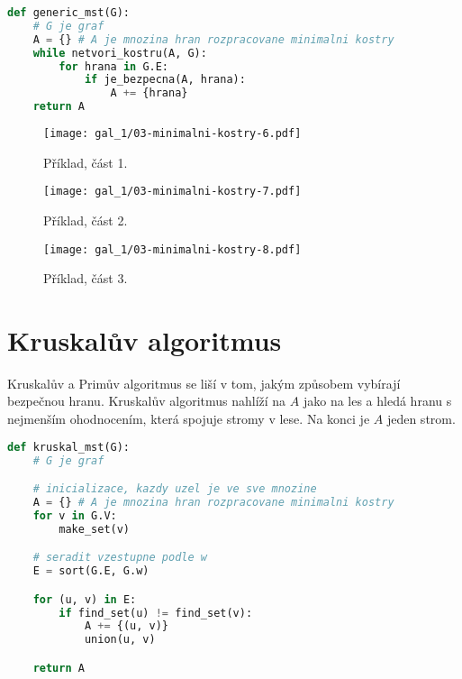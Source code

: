 \bigskip\noindent\begin{minipage}{\linewidth}
\begin{lstlisting}[language=Python, caption={Generický algoritmus. Před každou iterací algoritmu je množina $A$ podmnožinou nějaké minimální kostry. Hrana $(u,v) \in E$ je bezpečná pro $A$, pokud $A \cup \{(u, v)\}$ je podmnožinou nějaké minimální kostry.}]
def generic_mst(G):
    # G je graf
    A = {} # A je mnozina hran rozpracovane minimalni kostry
    while netvori_kostru(A, G):
        for hrana in G.E:
            if je_bezpecna(A, hrana):
                A += {hrana}
    return A
\end{lstlisting}
\end{minipage}

\begin{figure}[H]
    \centering
    \texttt{[image: gal\_1/03-minimalni-kostry-6.pdf]}
    \caption{Příklad, část 1.}
\end{figure}

\begin{figure}[H]
    \centering
    \texttt{[image: gal\_1/03-minimalni-kostry-7.pdf]}
    \caption{Příklad, část 2.}
\end{figure}

\begin{figure}[H]
    \centering
    \texttt{[image: gal\_1/03-minimalni-kostry-8.pdf]}
    \caption{Příklad, část 3.}
\end{figure}


\section{Kruskalův algoritmus}

Kruskalův a Primův algoritmus se liší v tom, jakým způsobem vybírají bezpečnou hranu. Kruskalův algoritmus nahlíží na $A$ jako na les a hledá hranu s nejmenším ohodnocením, která spojuje stromy v lese. Na konci je $A$ jeden strom.

\bigskip\noindent\begin{minipage}{\linewidth}
\begin{lstlisting}[language=Python, caption={Kruskalův algoritmus. Funkce \texttt{make\_set(v)} vytvoří množinu obsahující $v$, \texttt{find\_set(v)} vrátí reprezentanta množiny ve které se nachází $v$, \texttt{union(u, v)} sjednotí dvě množiny obsahující $u$ a $v$.}]
def kruskal_mst(G):
    # G je graf

    # inicializace, kazdy uzel je ve sve mnozine
    A = {} # A je mnozina hran rozpracovane minimalni kostry
    for v in G.V:
        make_set(v)

    # seradit vzestupne podle w
    E = sort(G.E, G.w)

    for (u, v) in E:
        if find_set(u) != find_set(v):
            A += {(u, v)}
            union(u, v)

    return A
\end{lstlisting}
\end{minipage}

